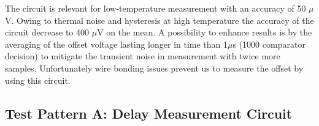 The circuit is relevant for low-temperature measurement with an accuracy of 50 \(\mu\)V. Owing to thermal noise and hysteresis at high temperature the accuracy of the circuit decrease to 400 \(\mu\)V on the mean. A possibility to enhance results is by the averaging of the offset voltage lasting longer in time than 1\(\mu\)s (1000 comparator decision) to mitigate the transient noise in measurement with twice more samples. Unfortunately wire bonding issues prevent us to measure the offset by using this circuit.

\subsection{Test Pattern A: Delay Measurement Circuit}
